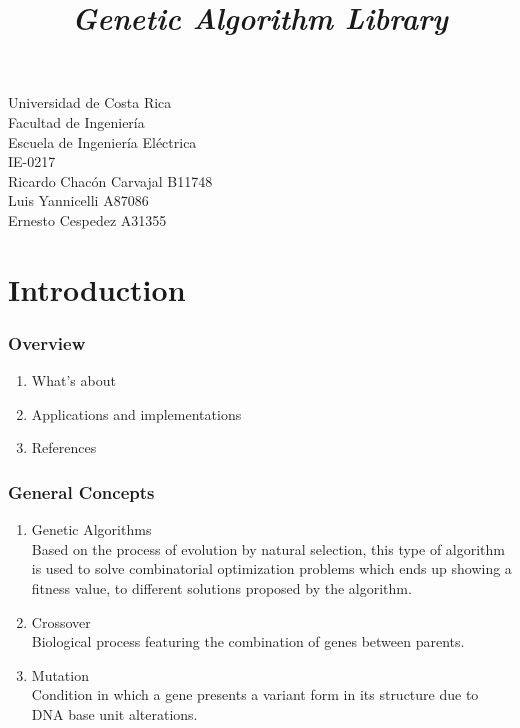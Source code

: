 \documentclass{beamer}%
\begin{document}
\title{\emph{Genetic Algorithm Library}}




\begin{frame}[plain]
\titlepage
\begin{center}
Universidad de Costa Rica\\
Facultad de Ingeniería\\
Escuela de Ingeniería Eléctrica\\
IE-0217\\
\bigskip
Ricardo Chac\'on Carvajal B11748\\
Luis Yannicelli A87086\\
Ernesto Cespedez A31355\\
\end{center}
\end{frame}


\section{Introduction}
\begin{frame}
\frametitle{Overview}
\begin{enumerate}
\item What's about 
\bigskip 
\bigskip
\item Applications and implementations
\bigskip
\bigskip
\item References
\end{enumerate}
\end{frame}


\begin{frame}
\frametitle{General Concepts}
\begin{enumerate}
\item Genetic Algorithms\\
Based on the process of evolution by natural selection, this type of
algorithm is used to solve combinatorial optimization problems
which ends up showing a fitness value, to different solutions
proposed by the algorithm.

\bigskip 
\item Crossover\\
Biological process featuring the combination of genes between
parents.

\bigskip
\item Mutation\\
Condition in which a gene presents a variant form in its structure
due to DNA base unit alterations.

\end{enumerate}
\end{frame}
\end{document}
